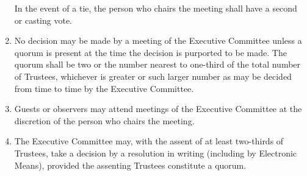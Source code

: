 \documentclass[11pt,a4paper, oneside]{memoir}
\begin{document}
\begin{enumerate}
		In the event of a tie, the person who chairs the meeting shall have a second or casting vote.
		\item No decision may be made by a meeting of the Executive Committee unless a quorum is present at the time the decision is purported to be made.
		The quorum shall be two or the number nearest to one-third of the total number of Trustees, whichever is greater or such larger number as may be decided from time to time by the Executive Committee.
		\item Guests or observers may attend meetings of the Executive Committee at the discretion of the person who chairs the meeting.
		\item The Executive Committee may, with the assent of at least two-thirds of Trustees, take a decision by a resolution in writing (including by Electronic Means), provided the assenting Trustees constitute a quorum.
	\end{enumerate}
\end{document}
